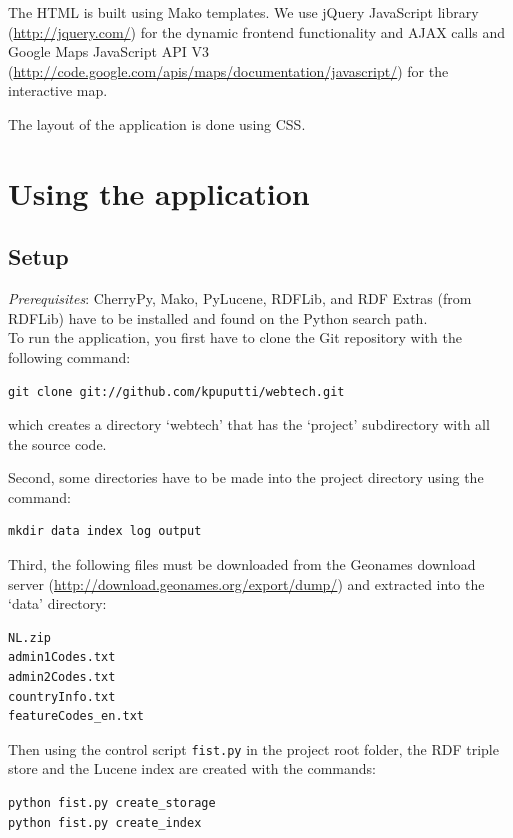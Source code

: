 \documentclass[a4paper,12pt]{article}
\begin{document}
The HTML is built using Mako templates. We use jQuery JavaScript
library (\url{http://jquery.com/}) for the dynamic frontend
functionality and AJAX calls and Google Maps JavaScript API V3
(\url{http://code.google.com/apis/maps/documentation/javascript/}) for
the interactive map.

The layout of the application is done using CSS.

\section{Using the application}

\subsection{Setup}

\noindent \textit{Prerequisites}: CherryPy, Mako, PyLucene, RDFLib,
and RDF Extras (from RDFLib) have to be installed and found on the
Python search path.\\

\noindent To run the application, you first have to clone the Git
repository with the following command:

\begin{verbatim}
git clone git://github.com/kpuputti/webtech.git
\end{verbatim}

\noindent which creates a directory `webtech' that has the `project'
subdirectory with all the source code.

Second, some directories have to be made into the project directory
using the command:

\begin{verbatim}
mkdir data index log output
\end{verbatim}

\noindent Third, the following files must be downloaded from the
Geonames download server
(\url{http://download.geonames.org/export/dump/}) and extracted into
the `data' directory:

\begin{verbatim}
NL.zip
admin1Codes.txt
admin2Codes.txt
countryInfo.txt
featureCodes_en.txt
\end{verbatim}

\noindent Then using the control script \texttt{fist.py} in the
project root folder, the RDF triple store and the Lucene index are
created with the commands:

\begin{verbatim}
python fist.py create_storage
python fist.py create_index
\end{verbatim}
\end{document}
